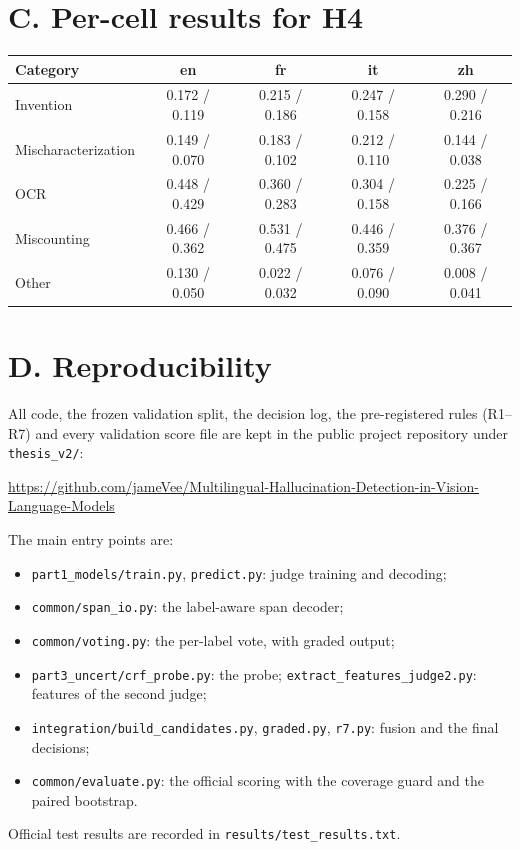 \section*{C. Per-cell results for H4}

\begin{center}
    \label{tab:h4cells}
    \begin{tabular}{lcccc}
    \toprule
    Category & en & fr & it & zh \\
    \midrule
    Invention & 0.172 / 0.119 & 0.215 / 0.186 & 0.247 / 0.158 & 0.290 / 0.216 \\
    Mischaracterization & 0.149 / 0.070 & 0.183 / 0.102 & 0.212 / 0.110 & 0.144 / 0.038 \\
    OCR & 0.448 / 0.429 & 0.360 / 0.283 & 0.304 / 0.158 & 0.225 / 0.166 \\
    Miscounting & 0.466 / 0.362 & 0.531 / 0.475 & 0.446 / 0.359 & 0.376 / 0.367 \\
    Other & 0.130 / 0.050 & 0.022 / 0.032 & 0.076 / 0.090 & 0.008 / 0.041 \\
    \bottomrule
    \end{tabular}
\end{center}

\section*{D. Reproducibility}

All code, the frozen validation split, the decision log, the pre-registered rules (R1--R7) and every validation score file are kept in the public project repository under \texttt{thesis\_v2/}:
\begin{center}
\url{https://github.com/jameVee/Multilingual-Hallucination-Detection-in-Vision-Language-Models}
\end{center}
The main entry points are:
\begin{itemize}
    \item \texttt{part1\_models/train.py}, \texttt{predict.py}: judge training and decoding;
    \item \texttt{common/span\_io.py}: the label-aware span decoder;
    \item \texttt{common/voting.py}: the per-label vote, with graded output;
    \item \texttt{part3\_uncert/crf\_probe.py}: the probe; \texttt{extract\_features\_judge2.py}: features of the second judge;
    \item \texttt{integration/build\_candidates.py}, \texttt{graded.py}, \texttt{r7.py}: fusion and the final decisions;
    \item \texttt{common/evaluate.py}: the official scoring with the coverage guard and the paired bootstrap.
\end{itemize}
Official test results are recorded in \texttt{results/test\_results.txt}.
